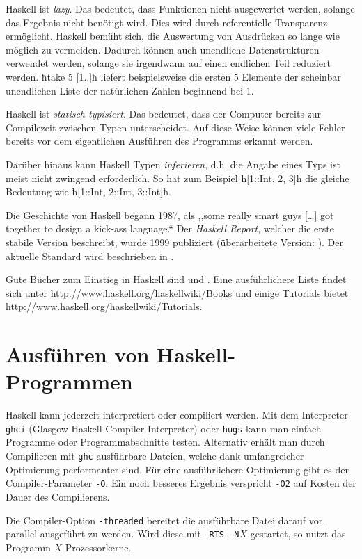 Haskell ist \emph{lazy}.
Das bedeutet, dass Funktionen nicht ausgewertet werden, solange das Ergebnis
nicht benötigt wird. Dies wird durch referentielle Transparenz ermöglicht.
Haskell bemüht sich, die Auswertung von Ausdrücken so lange wie möglich zu
vermeiden. 
Dadurch können auch unendliche Datenstrukturen
 verwendet werden, solange sie irgendwann auf einen endlichen Teil
reduziert werden. ħtake 5 [1..]ħ liefert beispielsweise die ersten 5 Elemente
der scheinbar unendlichen Liste der natürlichen Zahlen beginnend bei 1.

Haskell ist \emph{statisch typisiert}.
Das bedeutet, dass der Computer bereits zur Compilezeit zwischen Typen
unterscheidet. Auf diese Weise können viele Fehler bereits vor dem 
eigentlichen Ausführen des Programms erkannt werden.

Darüber hinaus kann Haskell Typen \emph{inferieren},
d.h. die Angabe eines Typs ist meist nicht zwingend erforderlich.
So hat zum Beispiel ħ[1::Int, 2, 3]ħ die gleiche Bedeutung wie 
ħ[1::Int, 2::Int, 3::Int]ħ.

Die Geschichte von Haskell begann 1987, als 
,,some really smart guys [\ldots] got together to design a kick-ass language.``
\autocite[Section 1]{lyahfgg}
Der \emph{Haskell Report}, welcher die erste stabile Version
beschreibt, wurde 1999 publiziert (überarbeitete Version: \autocite{haskell98}).
Der aktuelle Standard wird beschrieben in \autocite{haskell2010}.

Gute Bücher zum Einstieg in Haskell sind \autocite{Hutton} und
\autocite{lyahfgg}. Eine ausführlichere Liste findet sich unter 
\url{http://www.haskell.org/haskellwiki/Books} und 
einige Tutorials bietet 
\url{http://www.haskell.org/haskellwiki/Tutorials}.


\section{Ausführen von Haskell-Programmen}

Haskell kann jederzeit interpretiert oder compiliert werden. Mit dem
Interpreter \texttt{ghci} (Glasgow Haskell Compiler Interpreter)
oder \texttt{hugs} kann man einfach Programme oder
Programmabschnitte testen.
Alternativ erhält man durch Compilieren mit \texttt{ghc} ausführbare Dateien,
welche dank umfangreicher Optimierung performanter sind. Für eine
ausführlichere Optimierung gibt es den Compiler-Parameter \texttt{-O}. Ein
noch besseres Ergebnis verspricht \texttt{-O2} auf Kosten der Dauer des
Compilierens.

Die Compiler-Option \texttt{-threaded} bereitet die ausführbare Datei darauf
vor, parallel ausgeführt zu werden. Wird diese mit \texttt{-RTS -N$X$}
gestartet, so nutzt das Programm $X$ Prozessorkerne.

